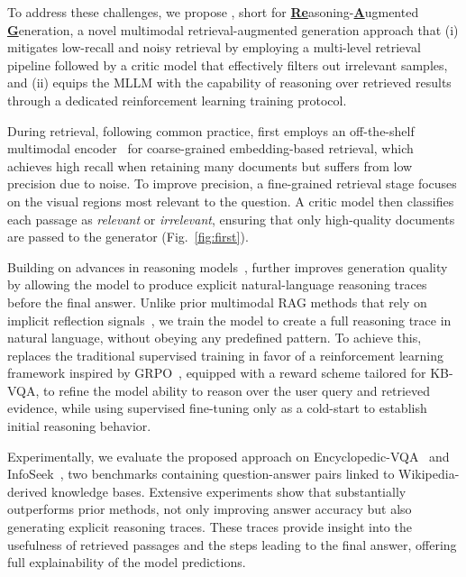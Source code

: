 To address these challenges, we propose \textbf{\ours}, short for \underline{\textbf{Re}}asoning-\underline{\textbf{A}}ugmented \underline{\textbf{G}}eneration, a novel multimodal retrieval-augmented generation approach that (i) mitigates low-recall and noisy retrieval by employing a multi-level retrieval pipeline followed by a critic model that effectively filters out irrelevant samples, and (ii) equips the MLLM with the capability of reasoning over retrieved results through a dedicated reinforcement learning training protocol. 

During retrieval, 
following common practice, \ours first employs an off-the-shelf multimodal encoder~\cite{radford2021learning, sun2024eva} for coarse-grained embedding-based retrieval, which achieves high recall when retaining many documents but suffers from low precision due to noise. To improve precision, a fine-grained retrieval stage focuses on the visual regions most relevant to the question. A critic model then classifies each passage as \textit{relevant} or \textit{irrelevant}, ensuring that only high-quality documents are passed to the generator (Fig.~\ref{fig:first}).


Building on advances in reasoning models~\cite{guo2025deepseek}, \ours further improves generation quality by allowing the model to produce explicit natural-language reasoning traces before the final answer.
Unlike prior multimodal RAG methods that rely on implicit reflection signals~\cite{asaiself, cocchi2025augmenting}, we train the model to create a full reasoning trace in natural language, without obeying any predefined pattern. To achieve this, \ours replaces the traditional supervised training in favor of a reinforcement learning framework inspired by GRPO~\cite{shao2024deepseekmath,yu2025dapo}, equipped with a reward scheme tailored for KB-VQA, to refine the model ability to reason over the user query and retrieved evidence, while using supervised fine-tuning only as a cold-start to establish initial reasoning behavior.


Experimentally, we evaluate the proposed approach on Encyclopedic-VQA~\cite{mensink2023encyclopedic} and InfoSeek~\cite{chen2023can}, two benchmarks containing question-answer pairs linked to Wikipedia-derived knowledge bases. Extensive experiments show that \ours substantially outperforms prior methods, not only improving answer accuracy but also generating explicit reasoning traces. These traces provide insight into the usefulness of retrieved passages and the steps leading to the final answer, offering full explainability of the model predictions.

